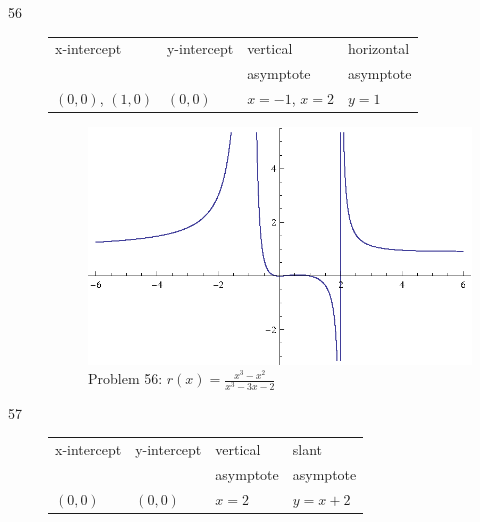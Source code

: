 \documentclass{exam}
\begin{document}
\begin{description}
    \item[56]
      \begin{tabular}{llll}
        \toprule
        x-intercept        & y-intercept & vertical          & horizontal \\
                           &             & asymptote         & asymptote \\
        \midrule
        $(0, 0)$, $(1, 0)$ & $(0, 0)$    & $x = -1$, $x = 2$ & $y = 1$ \\
        \bottomrule
      \end{tabular}

      \begin{figure}[H]
        \centering
        \includegraphics[scale = 0.8]{problem56.eps}
        \caption*{ Problem 56: $r(x) = \frac{x^3 - x^2}{x^3 - 3x - 2}$ }
      \end{figure}

    \item[57]
      \begin{tabular}{llll}
        \toprule
        x-intercept & y-intercept & vertical  & slant \\
                    &             & asymptote & asymptote \\
        \midrule
        $(0, 0)$    & $(0, 0)$    & $x = 2$   & $y = x + 2$ \\
        \bottomrule
      \end{tabular}


\end{description}
\end{document}

